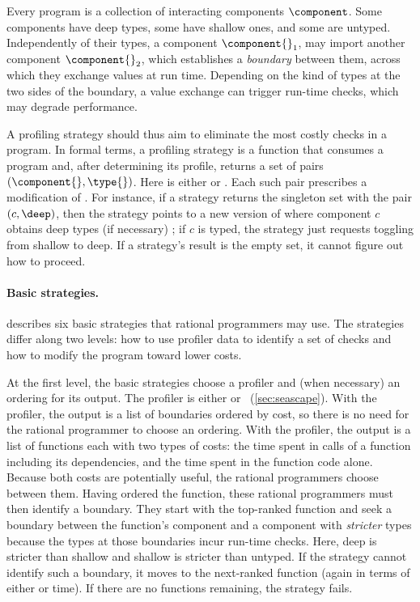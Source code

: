 Every program \program{} is a collection of interacting components $\component$.
Some components have deep types, some have shallow ones, and some
are untyped. Independently of their types, a component $\component{}_1$, may
import another component $\component{}_2$, which establishes a \emph{boundary}
between them, across which they exchange values at run time. Depending on the
kind of types at the two sides of the boundary, a value exchange can trigger
run-time checks, which may degrade performance.

A profiling strategy should thus aim to eliminate the most costly
checks in a program. In formal terms, a profiling strategy is a
function that consumes a program \program{} and, after determining its
profile, returns a set of pairs $(\component{}, \type{})$. Here \type{} is
either \deep{} or \shallow{}. Each such pair prescribes a modification of
\program{}. For instance, if a strategy returns the singleton set with the
pair $(c, \deep)$, then the strategy points to a new version of \program{}
where component $c$ obtains deep types (if necessary) ; if $c$ is typed,
the strategy just requests toggling from shallow to deep.  If a strategy's
result is the empty set, it cannot figure out how to proceed.

\paragraph{Basic strategies.}   describes six basic
strategies that rational programmers may use.
The strategies differ along two levels: how to use profiler data to identify
a set of checks and how to modify the program toward lower costs.

At the first level, the basic strategies choose a profiler and (when
necessary) an ordering for its output.  The profiler is either \featkw{}
or \statkw{}~(\cref{sec:seascape}).  With the \boundary{} profiler, the
output is a list of boundaries ordered by cost, so there is no need for
the rational programmer to choose an ordering.  With the \statistical{}
profiler, the output is a list of functions each with two types of costs:
the \totalkw{} time spent in  calls of a function including its
dependencies, and the \selfkw{} time spent in the function code alone.
Because both costs are potentially useful, the rational programmers choose
between them.  Having ordered the function, these rational programmers
must then identify a boundary.  They start with the top-ranked function
and seek a boundary between the function's component and a component with
\emph{stricter} types because the types at those boundaries incur run-time checks.
Here, deep is stricter than shallow and shallow is stricter than untyped.
If the strategy cannot identify such a boundary, it moves to the
next-ranked function (again in terms of either \selfkw{} or \totalkw{}
time).  If there are no functions remaining, the strategy fails.

